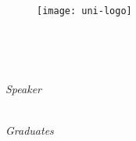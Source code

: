 \begin{titlepage}
    \begin{center}
        \begin{LARGE}
            \textbf{\myUni}\\
        \end{LARGE}

        \vspace{10pt}

        \begin{Large}
            \textsc{\myDepartment}\\
        \end{Large}

        \vspace{10pt}

        \begin{large}
            \textsc{\myFaculty}\\
        \end{large}

        \vspace{30pt}
        \begin{figure}[htbp]
            \centering
            \texttt{[image: uni-logo]}
        \end{figure}
        \vspace{30pt}

        \begin{LARGE}
            \textbf{\myTitle}\\
        \end{LARGE}

        \vspace{10pt}

        \begin{large}
            \textsl{\myDegree}\\
        \end{large}

        \vspace{40pt}

        \begin{large}
            \begin{flushleft}
                \textit{Speaker}\\
                \vspace{5pt}
                \profTitle\ \myProf
            \end{flushleft}
             \vspace{-52pt}

            \begin{flushright}
                \textit{Graduates}\\
                \vspace{5pt}
                \myName \\
                \vspace{5pt}
            \end{flushright}
        \end{large}


\end{center}
\end{titlepage}
